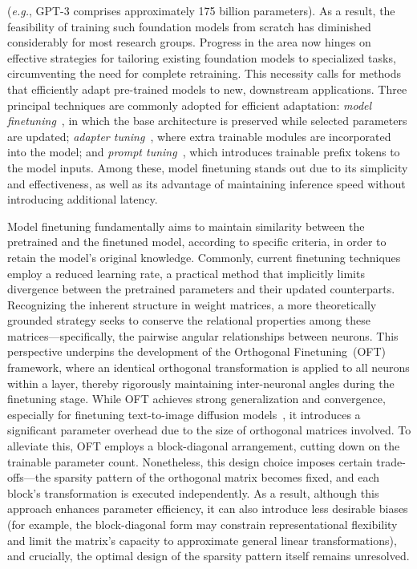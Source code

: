 (\emph{e.g.}, GPT-3 comprises approximately 175 billion parameters). As a result, the feasibility of training such foundation models from scratch has diminished considerably for most research groups. Progress in the area now hinges on effective strategies for tailoring existing foundation models to specialized tasks, circumventing the need for complete retraining. This necessity calls for methods that efficiently adapt pre-trained models to new, downstream applications. Three principal techniques are commonly adopted for efficient adaptation: \emph{model finetuning}~\cite{hulora2022,zaken2022bitfit,guo2020parameter,raffel2020exploring,qiu2023controlling,zhang2022adaptive,chavan2023one}, in which the base architecture is preserved while selected parameters are updated; \emph{adapter tuning}~\cite{rebuffi2017learning,houlsby2019parameter,pfeiffer2020adapterfusion,lin2020exploring,he2021towards}, where extra trainable modules are incorporated into the model; and \emph{prompt tuning}~\cite{li2021prefix,lester2021power}, which introduces trainable prefix tokens to the model inputs. Among these, model finetuning stands out due to its simplicity and effectiveness, as well as its advantage of maintaining inference speed without introducing additional latency.

Model finetuning fundamentally aims to maintain similarity between the pretrained and the finetuned model, according to specific criteria, in order to retain the model’s original knowledge. Commonly, current finetuning techniques employ a reduced learning rate, a practical method that implicitly limits divergence between the pretrained parameters and their updated counterparts. Recognizing the inherent structure in weight matrices, a more theoretically grounded strategy seeks to conserve the relational properties among these matrices—specifically, the pairwise angular relationships between neurons. This perspective underpins the development of the Orthogonal Finetuning~(OFT)~\cite{qiu2023controlling} framework, where an identical orthogonal transformation is applied to all neurons within a layer, thereby rigorously maintaining inter-neuronal angles during the finetuning stage. While OFT achieves strong generalization and convergence, especially for finetuning text-to-image diffusion models~\cite{qiu2023controlling}, it introduces a significant parameter overhead due to the size of orthogonal matrices involved. To alleviate this, OFT employs a block-diagonal arrangement, cutting down on the trainable parameter count. Nonetheless, this design choice imposes certain trade-offs—the sparsity pattern of the orthogonal matrix becomes fixed, and each block’s transformation is executed independently. As a result, although this approach enhances parameter efficiency, it can also introduce less desirable biases (for example, the block-diagonal form may constrain representational flexibility and limit the matrix’s capacity to approximate general linear transformations), and crucially, the optimal design of the sparsity pattern itself remains unresolved.

